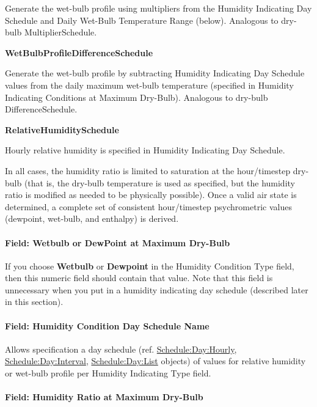 Generate the wet-bulb profile using multipliers from the Humidity Indicating Day Schedule and Daily Wet-Bulb Temperature Range (below). Analogous to dry-bulb MultiplierSchedule.

\textbf{WetBulbProfileDifferenceSchedule}

Generate the wet-bulb profile by subtracting Humidity Indicating Day Schedule values from the daily maximum wet-bulb temperature (specified in Humidity Indicating Conditions at Maximum Dry-Bulb). Analogous to dry-bulb DifferenceSchedule.

\textbf{RelativeHumiditySchedule}

Hourly relative humidity is specified in Humidity Indicating Day Schedule.

In all cases, the humidity ratio is limited to saturation at the hour/timestep dry-bulb (that is, the dry-bulb temperature is used as specified, but the humidity ratio is modified as needed to be physically possible). Once a valid air state is determined, a complete set of consistent hour/timestep psychrometric values (dewpoint, wet-bulb, and enthalpy) is derived.

\paragraph{Field: Wetbulb or DewPoint at Maximum Dry-Bulb}\label{field-wetbulb-or-dewpoint-at-maximum-dry-bulb}

If you choose \textbf{Wetbulb} or \textbf{Dewpoint} in the Humidity Condition Type field, then this numeric field should contain that value. Note that this field is unnecessary when you put in a humidity indicating day schedule (described later in this section).

\paragraph{Field: Humidity Condition Day Schedule Name}\label{field-humidity-condition-day-schedule-name}

Allows specification a day schedule (ref. \hyperref[scheduledayhourly]{Schedule:Day:Hourly}, \hyperref[scheduledayinterval]{Schedule:Day:Interval}, \hyperref[scheduledaylist]{Schedule:Day:List} objects) of values for relative humidity or wet-bulb profile per Humidity Indicating Type field.

\paragraph{Field: Humidity Ratio at Maximum Dry-Bulb}\label{field-humidity-ratio-at-maximum-dry-bulb}

